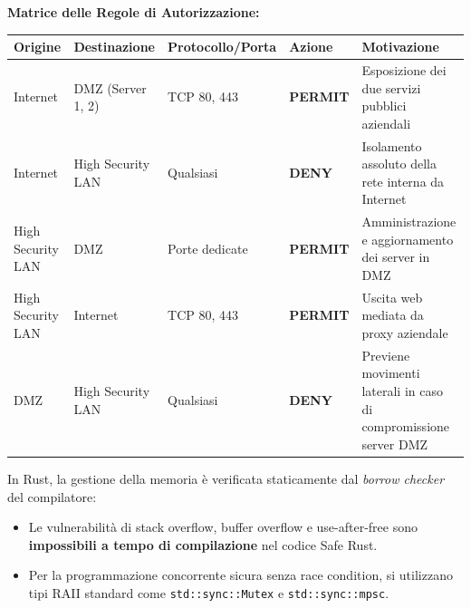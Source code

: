 \documentclass[11pt,a4paper]{article}
\begin{document}
\begin{solutionbox}
\textbf{Matrice delle Regole di Autorizzazione:}
\begin{center}
\small
\begin{tabularx}{\textwidth}{llllX}
\toprule
\textbf{Origine} & \textbf{Destinazione} & \textbf{Protocollo/Porta} & \textbf{Azione} & \textbf{Motivazione} \\
\midrule
Internet & DMZ (Server 1, 2) & TCP 80, 443 & \textbf{PERMIT} & Esposizione dei due servizi pubblici aziendali \\
Internet & High Security LAN & Qualsiasi & \textbf{DENY} & Isolamento assoluto della rete interna da Internet \\
High Security LAN & DMZ & Porte dedicate & \textbf{PERMIT} & Amministrazione e aggiornamento dei server in DMZ \\
High Security LAN & Internet & TCP 80, 443 & \textbf{PERMIT} & Uscita web mediata da proxy aziendale \\
DMZ & High Security LAN & Qualsiasi & \textbf{DENY} & Previene movimenti laterali in caso di compromissione server DMZ \\
\bottomrule
\end{tabularx}
\end{center}
\end{solutionbox}

\begin{altbox}
In Rust, la gestione della memoria \`e verificata staticamente dal \textit{borrow checker} del compilatore:
\begin{itemize}
    \item Le vulnerabilit\`a di stack overflow, buffer overflow e use-after-free sono \textbf{impossibili a tempo di compilazione} nel codice Safe Rust.
    \item Per la programmazione concorrente sicura senza race condition, si utilizzano tipi RAII standard come \texttt{std::sync::Mutex} e \texttt{std::sync::mpsc}.
\end{itemize}
\end{altbox}
\end{document}
